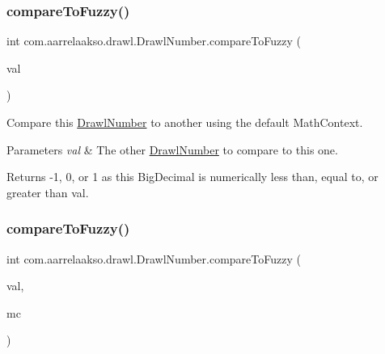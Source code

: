 \subsubsection{\texorpdfstring{compare\+To\+Fuzzy()}{compareToFuzzy()}\hspace{0.1cm}{\footnotesize\ttfamily [1/2]}}
{\footnotesize\ttfamily int com.\+aarrelaakso.\+drawl.\+Drawl\+Number.\+compare\+To\+Fuzzy (\begin{DoxyParamCaption}\item[{@Not\+Null \hyperlink{classcom_1_1aarrelaakso_1_1drawl_1_1_drawl_number}{Drawl\+Number}}]{val }\end{DoxyParamCaption})\hspace{0.3cm}{\ttfamily [protected]}}



Compare this \hyperlink{classcom_1_1aarrelaakso_1_1drawl_1_1_drawl_number}{Drawl\+Number} to another using the default Math\+Context. 


\begin{DoxyParams}{Parameters}
{\em val} & The other \hyperlink{classcom_1_1aarrelaakso_1_1drawl_1_1_drawl_number}{Drawl\+Number} to compare to this one. \\
\hline
\end{DoxyParams}
\begin{DoxyReturn}{Returns}
-\/1, 0, or 1 as this Big\+Decimal is numerically less than, equal to, or greater than val. 
\end{DoxyReturn}
\mbox{\label{classcom_1_1aarrelaakso_1_1drawl_1_1_drawl_number_a1b67bd833c724edd8ef7c6bdf387b96f}} 
\subsubsection{\texorpdfstring{compare\+To\+Fuzzy()}{compareToFuzzy()}\hspace{0.1cm}{\footnotesize\ttfamily [2/2]}}
{\footnotesize\ttfamily int com.\+aarrelaakso.\+drawl.\+Drawl\+Number.\+compare\+To\+Fuzzy (\begin{DoxyParamCaption}\item[{@Not\+Null \hyperlink{classcom_1_1aarrelaakso_1_1drawl_1_1_drawl_number}{Drawl\+Number}}]{val,  }\item[{Math\+Context}]{mc }\end{DoxyParamCaption})\hspace{0.3cm}{\ttfamily [protected]}}



